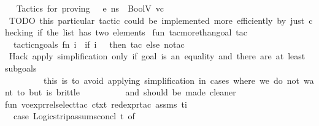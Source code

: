 \begin{isabellebody}
\isanewline
{}\isamarkupfalse%
\ {\isacartoucheopen}\isanewline
{\isacharparenleft}{\kern0pt}{\isacharasterisk}{\kern0pt}{\isacharasterisk}{\kern0pt}\ Tactics\ for\ proving\ {\isasymGamma}\ {\isasymturnstile}\ {\isasymlangle}e{\isacharcomma}{\kern0pt}\ ns{\isasymrangle}\ {\isasymDown}\ BoolV\ vc\ \ {\isacharasterisk}{\kern0pt}{\isacharasterisk}{\kern0pt}{\isacharparenright}{\kern0pt}\isanewline
\isanewline
{\isacharparenleft}{\kern0pt}{\isacharasterisk}{\kern0pt}\ TODO{\isacharcolon}{\kern0pt}\ this\ particular\ tactic\ could\ be\ implemented\ more\ efficiently\ by\ just\ checking\ if\ the\ list\ has\ two\ elements\ {\isacharasterisk}{\kern0pt}{\isacharparenright}{\kern0pt}\isanewline
fun\ tac{\isacharunderscore}{\kern0pt}more{\isacharunderscore}{\kern0pt}than{\isacharunderscore}{\kern0pt}{}{\isacharunderscore}{\kern0pt}goal\ tac\ {\isacharequal}{\kern0pt}\isanewline
\ \ tactic{\isacharunderscore}{\kern0pt}ngoals\ {\isacharparenleft}{\kern0pt}fn\ i\ {\isacharequal}{\kern0pt}{\isachargreater}{\kern0pt}\ if\ i\ {\isachargreater}{\kern0pt}\ {}\ then\ tac\ else\ no{\isacharunderscore}{\kern0pt}tac{\isacharparenright}{\kern0pt}\isanewline
\isanewline
{\isacharparenleft}{\kern0pt}{\isacharasterisk}{\kern0pt}\ Hack{\isacharcolon}{\kern0pt}\ apply\ simplification\ only\ if\ goal\ is\ an\ equality\ and\ there\ are\ at\ least\ {}\ subgoals\ \isanewline
\ \ \ \ \ \ \ \ \ this\ is\ to\ avoid\ applying\ simplification\ in\ cases\ where\ we\ do\ not\ want\ to{\isacharcomma}{\kern0pt}\ but\ is\ brittle\ \isanewline
\ \ \ \ \ \ \ \ \ and\ should\ be\ made\ cleaner\ {\isacharasterisk}{\kern0pt}{\isacharparenright}{\kern0pt}\isanewline
fun\ vc{\isacharunderscore}{\kern0pt}expr{\isacharunderscore}{\kern0pt}rel{\isacharunderscore}{\kern0pt}select{\isacharunderscore}{\kern0pt}tac\ ctxt\ red{\isacharunderscore}{\kern0pt}expr{\isacharunderscore}{\kern0pt}tac\ assms\ {\isacharparenleft}{\kern0pt}t{\isacharcomma}{\kern0pt}i{\isacharparenright}{\kern0pt}\ {\isacharequal}{\kern0pt}\isanewline
\ \ case\ {\isacharparenleft}{\kern0pt}Logic{\isachardot}{\kern0pt}strip{\isacharunderscore}{\kern0pt}assums{\isacharunderscore}{\kern0pt}concl\ t{\isacharparenright}{\kern0pt}\ of\isanewline

\end{isabellebody}
